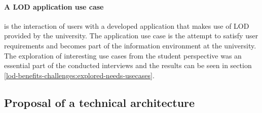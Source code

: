 \documentclass{article}
\begin{document}
\paragraph{A LOD application use case} 
\label{technical-architecture-challenges:lod-effort:use-case}
is the interaction of users with a developed application that makes use of LOD provided by the university. The application use case is the attempt to satisfy user requirements and becomes part of the information environment at the university. The exploration of interesting use cases from the student perspective was an essential part of the conducted interviews and the results can be seen in section \ref{lod-benefits-challenges:explored-needs-usecases}.

\subsection{Proposal of a technical architecture}
\label{technical-architecture-challenges:proposal}
\end{document}
